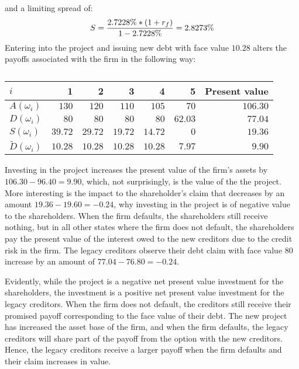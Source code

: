 \documentclass[main.tex]{subfiles}
\begin{document}
        and a limiting spread of:
        \begin{equation}
            S 
            = \frac{
                2.7228\% * (1 + r_{f})
            }{
                1 - 2.7228\%
            } 
            = 2.8273\%
        \end{equation}
        Entering into the project and issuing new debt with face value $10.28$ 
        alters the payoffs associated with the firm in the following way:
        \begin{table}[H]
            \centering
            \begin{tabular}{l|rrrrr||r}
                $i$ & 1 & 2 & 3 & 4 & 5 & Present value \\
                \hline
                $A(\omega_{i})$ & $130$ & $120$ & $110$ & $105$ & $70$ & $106.30$ \\
                $D(\omega_{i})$ & $80$ & $80$ & $80$ & $80$ & $62.03$ & $77.04$ \\
                $S(\omega_{i})$ & $39.72$ & $29.72$ & $19.72$ & $14.72$ & $0$ & $19.36$ \\
                $\tilde{D}(\omega_{i})$ & $10.28$ & $10.28$ & $10.28$ & $10.28$ & $7.97$ & $9.90$ \\
            \end{tabular}
            \caption{}
        \end{table}

        Investing in the project increases the present value of the firm's assets by $106.30 - 96.40 = 9.90$, 
        which, not surprisingly, is the value of the the project.
        More interesting is the impact to the shareholder's claim that decreases by an amount $19.36 - 19.60 = -0.24$, 
        why investing in the project is of negative value to the shareholders.
        When the firm defaults, the shareholders still receive nothing, 
        but in all other states where the firm does not default, 
        the shareholders pay the present value of the interest owed to the new creditors 
        due to the credit risk in the firm.
        The legacy creditors observe their debt claim with face value $80$ increase by an amount of
        $77.04 - 76.80 = -0.24$.

        Evidently, while the project is a negative net present value investment for the shareholders,
        the investment is a positive net present value investment for the legacy creditors.
        When the firm does not default, the creditors still receive their promised payoff 
        corresponding to the face value of their debt.
        The new project has increased the asset base of the firm, and when the firm defaults, 
        the legacy creditors will share part of the payoff from the option with the new creditors.
        Hence, the legacy creditors receive a larger payoff when the firm defaults and their claim increases in value. 
\end{document}
